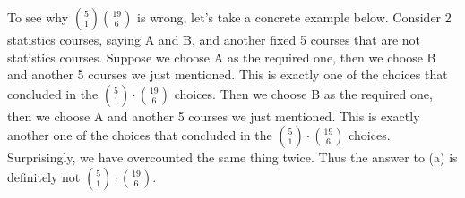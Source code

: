 {\begin{solution}
{            \item 
            To see why \(\binom{5}{1}\binom{19}{6}\) is wrong, let's take a concrete example below. 
            Consider 2 statistics courses, saying A and B, and another fixed 5 courses that are not statistics courses. 
            Suppose we choose A as the required one, then we choose B and another 5 courses we just mentioned. 
            This is exactly one of the choices that concluded in the $\binom{5}{1} \cdot \binom{19}{6}$ choices. 
            Then we choose B as the required one, then we choose A and another 5 courses we just mentioned. 
            This is exactly another one of the choices that concluded in the $\binom{5}{1} \cdot \binom{19}{6}$ choices. 
            Surprisingly, we have overcounted the same thing twice. 
            Thus the answer to (a) is definitely not $\binom{5}{1} \cdot \binom{19}{6}$. 
            
}
\end{solution}}
